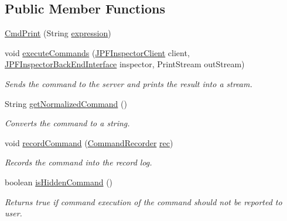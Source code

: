 \subsection*{Public Member Functions}
\begin{DoxyCompactItemize}
\item 
\hyperlink{classgov_1_1nasa_1_1jpf_1_1inspector_1_1client_1_1commands_1_1_cmd_print_aeb8fc8497775ea5be9114ddb8462273e}{Cmd\+Print} (String \hyperlink{classgov_1_1nasa_1_1jpf_1_1inspector_1_1client_1_1commands_1_1_cmd_print_a877a5a85ea359315e9efe4ff55a8e87c}{expression})
\item 
void \hyperlink{classgov_1_1nasa_1_1jpf_1_1inspector_1_1client_1_1commands_1_1_cmd_print_af70ccd2d15e8d3233fd05df6f0e46a83}{execute\+Commands} (\hyperlink{classgov_1_1nasa_1_1jpf_1_1inspector_1_1client_1_1_j_p_f_inspector_client}{J\+P\+F\+Inspector\+Client} client, \hyperlink{interfacegov_1_1nasa_1_1jpf_1_1inspector_1_1interfaces_1_1_j_p_f_inspector_back_end_interface}{J\+P\+F\+Inspector\+Back\+End\+Interface} inspector, Print\+Stream out\+Stream)
\begin{DoxyCompactList}\small\item\em Sends the command to the server and prints the result into a stream. \end{DoxyCompactList}\item 
String \hyperlink{classgov_1_1nasa_1_1jpf_1_1inspector_1_1client_1_1commands_1_1_cmd_print_a8bd2f3a028ff5bdc42b823766a47bc35}{get\+Normalized\+Command} ()
\begin{DoxyCompactList}\small\item\em Converts the command to a string. \end{DoxyCompactList}\item 
void \hyperlink{classgov_1_1nasa_1_1jpf_1_1inspector_1_1client_1_1_client_command_ae0670332ec750bc5b9016d0b04d8adfe}{record\+Command} (\hyperlink{classgov_1_1nasa_1_1jpf_1_1inspector_1_1client_1_1_command_recorder}{Command\+Recorder} \hyperlink{classgov_1_1nasa_1_1jpf_1_1inspector_1_1client_1_1_client_command_af4246f2427035c72a6af45a2c61361f7}{rec})
\begin{DoxyCompactList}\small\item\em Records the command into the record log. \end{DoxyCompactList}\item 
boolean \hyperlink{classgov_1_1nasa_1_1jpf_1_1inspector_1_1client_1_1_client_command_afb09c400c64e2d8e01059b91ff847761}{is\+Hidden\+Command} ()
\begin{DoxyCompactList}\small\item\em Returns true if command execution of the command should not be reported to user. \end{DoxyCompactList}\end{DoxyCompactItemize}
